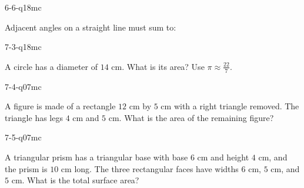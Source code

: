 \begin{practiceQuestion}{6-6-q18}{mc}
\begin{questionText}
Adjacent angles on a straight line must sum to:
\end{questionText}
\end{practiceQuestion}

\begin{practiceQuestion}{7-3-q18}{mc}
\begin{questionText}
A circle has a diameter of $14$ cm. What is its area? Use $\pi \approx \frac{22}{7}$.
\end{questionText}
\end{practiceQuestion}

\begin{practiceQuestion}{7-4-q07}{mc}
\begin{questionText}
A figure is made of a rectangle $12$ cm by $5$ cm with a right triangle removed. The triangle has legs $4$ cm and $5$ cm. What is the area of the remaining figure?
\end{questionText}
\end{practiceQuestion}

\begin{practiceQuestion}{7-5-q07}{mc}
\begin{questionText}
A triangular prism has a triangular base with base $6$ cm and height $4$ cm, and the prism is $10$ cm long. The three rectangular faces have widths $6$ cm, $5$ cm, and $5$ cm. What is the total surface area?
\end{questionText}
\end{practiceQuestion}

